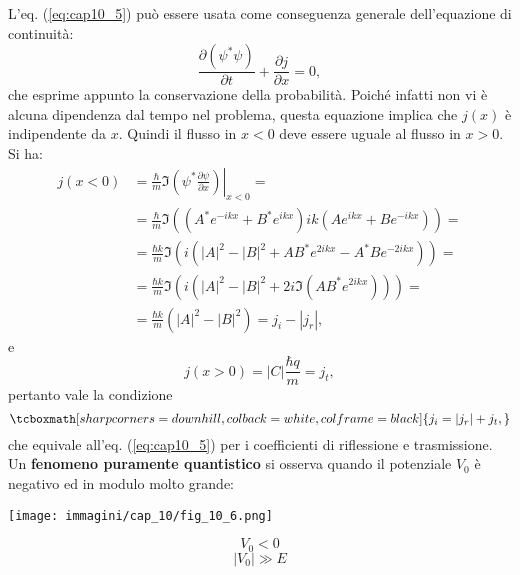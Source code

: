 L'eq. (\ref{eq:cap10_5}) può essere usata come conseguenza generale dell'equazione di continuità:
	\begin{equation}
		\frac{\partial \left(\psi^* \psi \right)}{\partial t}+ \frac{\partial j}{\partial x}=0,
	\end{equation}
che esprime appunto la conservazione della probabilità. Poiché infatti non vi è alcuna dipendenza dal tempo nel problema, questa equazione implica che $j(x)$ è indipendente da $x$. Quindi il flusso in $x<0$ deve essere uguale al flusso in $x>0$. Si ha:
	\begin{align}
		j\left( x<0 \right) &= \frac{\hbar}{m} \Im \left. \left( \psi ^* \frac{\partial \psi}{\partial x} \right) \right| _{x<0} = \nonumber \\
		&= \frac{\hbar}{m} \Im \left( \left( A^* e^{-ikx} + B^* e^{ikx}\right)ik \left( A e^{ikx} + B e^{-ikx}\right)\right)= \nonumber \\
		&=\frac{\hbar k}{m} \Im \left( i\left( |A|^2 - |B|^2 +AB^* e^{2ikx}- A^* B e^{-2ikx}\right)\right)= \nonumber \\
		&=\frac{\hbar k}{m} \Im \left( i\left( |A|^2 - |B|^2 +2i \Im \left( A B^* e^{2ikx}\right) \right)\right)= \nonumber \\
		&= \frac{\hbar k}{m}\left( |A|^2 - |B|^2\right)= j_i- |j_r|,
\end{align}
e
	\begin{equation}
		j\left( x>0 \right) = |C| \frac{\hbar q}{m}= j_t,
	\end{equation}
pertanto vale la condizione
	\begin{equation}
		\tcboxmath[sharp corners=downhill, colback=white, colframe=black]{
			j_i = |j_r|+ j_t,
			}
	\end{equation}
che equivale all'eq. (\ref{eq:cap10_5}) per i coefficienti di riflessione e trasmissione.\\

Un \textbf{fenomeno puramente quantistico} si osserva quando il potenziale $V_0$ è negativo ed in modulo molto grande:\\
\begin{minipage}{.7\textwidth}
\texttt{[image: immagini/cap\_10/fig\_10\_6.png]}
\end{minipage}
\hspace{.5cm}
\begin{minipage}{.1\textwidth}
\[V_0<0\]
\[|V_0| \gg E\]
\end{minipage}\\ \\

